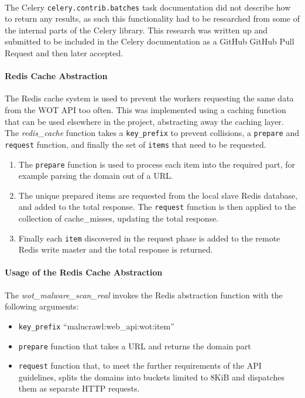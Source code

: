 \paragraph{}
The Celery \verb`celery.contrib.batches` task documentation did not describe how to return any results, as such this functionality had to be researched from some of the internal parts of the Celery library.  This research was written up and submitted to be included in the Celery documentation as a GitHub GitHub Pull Request and then later accepted\cite{celery-batches-docfix}.

\paragraph{Redis Cache Abstraction}
The Redis cache system is used to prevent the workers requesting the same data from the WOT API too often.  This was implemented using a caching function that can be used elsewhere in the project, abstracting away the caching layer.  The \emph{redis\_cache} function takes a \verb`key_prefix` to prevent collisions, a \verb`prepare` and \verb`request` function, and finally the set of \verb`items` that need to be requested.

\begin{enumerate}
    \item The \verb`prepare` function is used to process each item into the required part, for example parsing the domain out of a URL.

    \item The unique prepared items are requested from the local slave Redis database, and added to the total response. The \verb`request` function is then applied to the collection of cache\_misses, updating the total response.

    \item Finally each \verb`item` discovered in the request phase is added to the remote Redis write master and the total response is returned.
\end{enumerate}

\paragraph{Usage of the Redis Cache Abstraction}
The \emph{wot\_malware\_scan\_real} invokes the Redis abstraction function with the following arguments:
\begin{itemize}
    \item \verb`key_prefix` ``malucrawl:web\_api:wot:{item}''
    \item \verb`prepare` function that takes a URL and returns the domain part
    \item \verb`request` function that, to meet the further requirements of the API guidelines, splits the domains into buckets limited to 8KiB and dispatches them as separate HTTP requests.
\end{itemize}

